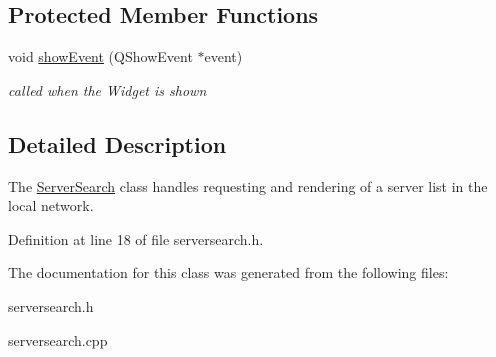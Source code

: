 \subsection*{Protected Member Functions}
\begin{DoxyCompactItemize}
\item 
\hypertarget{class_server_search_a7b9bf3523032f803b44aca2fe27a11dd}{void \hyperlink{class_server_search_a7b9bf3523032f803b44aca2fe27a11dd}{show\-Event} (Q\-Show\-Event $\ast$event)}\label{class_server_search_a7b9bf3523032f803b44aca2fe27a11dd}

\begin{DoxyCompactList}\small\item\em called when the Widget is shown \end{DoxyCompactList}\end{DoxyCompactItemize}


\subsection{Detailed Description}
The \hyperlink{class_server_search}{Server\-Search} class handles requesting and rendering of a server list in the local network. 

Definition at line 18 of file serversearch.\-h.



The documentation for this class was generated from the following files\-:\begin{DoxyCompactItemize}
\item 
serversearch.\-h\item 
serversearch.\-cpp\end{DoxyCompactItemize}
